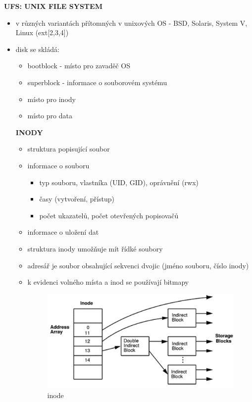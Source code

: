 \documentclass[10pt,a4paper]{article}
\begin{document}
\textbf{UFS: UNIX FILE SYSTEM}
\begin{itemize}
	\item v různých variantách přítomných v unixových OS - BSD, Solaris, System V, Linux (ext[2,3,4])
	\item disk se skládá:
	\begin{itemize}
		\item bootblock - místo pro zavaděč OS
		\item superblock - informace o souborovém systému
		\item místo pro inody
		\item místo pro data
	\end{itemize}
	\textbf{INODY}
	\begin{itemize}
		\item struktura popisující soubor
		\item informace o souboru
		\begin{itemize}
			\item typ souboru, vlastníka (UID, GID), oprávnění (rwx)
			\item časy (vytvoření, přístup)
			\item počet ukazatelů, počet otevřených popisovačů
		\end{itemize}
		\item informace o uložení dat
		\item struktura inody umožňuje mít řídké soubory
		\item adresář je soubor obsahující sekvenci dvojic (jméno souboru, číslo inody)
		\item k evidenci volného místa a inod se používají bitmapy
		\begin{figure} [h]
			\includegraphics[scale=0.9]{img/inode.png}
			\caption{inode}
		\end{figure}
	\end{itemize}
\end{itemize}
\end{document}
